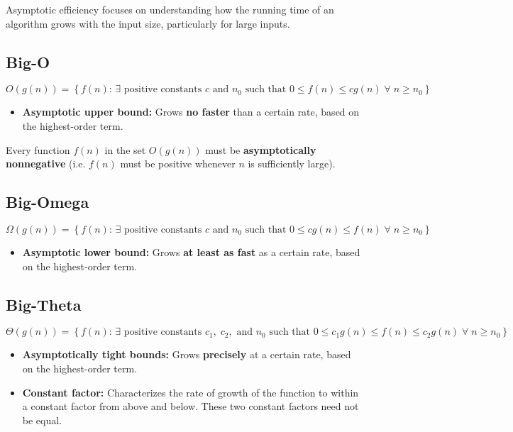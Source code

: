 Asymptotic efficiency focuses on understanding how the running time of an algorithm grows with the input size, particularly for large inputs.
\subsection{Big-O}
    \begin{definition}
        $ O(g(n)) = \left\{ f(n) \text{: } \exists \text{ positive constants } c \text{ and } n_0 \text{ such that } 0 \leq f(n) \leq c g(n) \; \forall \; n \geq n_0 \right\} $
        \begin{itemize}
            \item \textbf{Asymptotic upper bound:} Grows \textbf{no faster} than a certain rate, based on the highest-order term.
        \end{itemize}
    \end{definition}

    \begin{warning}
        Every function $f(n)$ in the set $O(g(n))$ must be \textbf{asymptotically nonnegative} (i.e. $f(n)$ must be positive whenever $n$ is sufficiently large).
    \end{warning}

\subsection{Big-Omega}
    \begin{definition}
        $ \Omega(g(n)) = \left\{ f(n) \text{: } \exists \text{ positive constants } c \text{ and } n_0 \text{ such that } 0 \leq c g(n) \leq f(n) \; \forall \; n \geq n_0 \right\} $
        \begin{itemize}
            \item \textbf{Asymptotic lower bound:} Grows \textbf{at least as fast} as a certain rate, based on the highest-order term.
        \end{itemize}
    \end{definition}

\subsection{Big-Theta}
    \begin{definition}
        $ \Theta(g(n)) = \left\{ f(n) \text{: } \exists \text{ positive constants } c_1, \; c_2, \text{ and } n_0 \text{ such that } 0 \leq c_1 g(n) \leq f(n) \leq c_2 g(n) \; \forall \; n \geq n_0 \right\} $
        \begin{itemize}
            \item \textbf{Asymptotically tight bounds:} Grows \textbf{precisely} at a certain rate, based on the highest-order term.
            \item \textbf{Constant factor:} Characterizes the rate of growth of the function to within a constant factor from above and below. These two constant factors need not be equal.
        \end{itemize}
    \end{definition}

